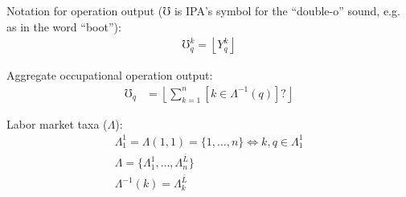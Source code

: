 \documentclass[hidelinks, nonatbib]{elsarticle}
\begin{document}
Notation for operation output ($\mho$ is IPA's symbol for the ``double-o'' sound, e.g. as in the word ``boot''):
\begin{gather}
    \mho_{q}^{k} = 
    \left\lfloor 
        {Y}_{q}^{k}
    \right\rfloor
\end{gather}

Aggregate occupational operation output:
\begin{align}
    \mho_{q} 
    &= 
    \left\lfloor
    \sum_{k=1}^{n}
        [k \in {\Lambda}^{-1}(q)]
        ?
    \right\rfloor
\end{align}

Labor market taxa ($\Lambda$):
\begin{gather}
    \Lambda_{1}^{1}
    = \Lambda(1,1)
    = \{
        1, \dots, n
        \}
    \iff k, q \in 
    \Lambda_{1}^{1}
    \\
    \Lambda = \{
        \Lambda_{1}^{1},
        \dots,
        \Lambda_{n}^{\bar{L}}
        \}
    \\
    \Lambda^{-1}(k) = \Lambda_{k}^{\bar{L}}
\end{gather}
\end{document}
